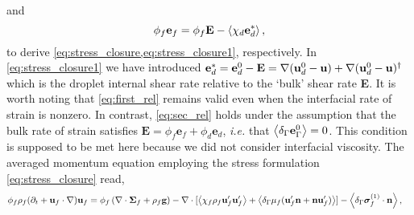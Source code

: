 and
\begin{equation}
\phi _f\textbf{e}_f
    = 
    \phi_f \textbf{E}
    - \avg{\chi_d \textbf{e}_d^*},
    \label{eq:sec_rel}
\end{equation}
to derive \ref{eq:stress_closure,eq:stress_closure1}, respectively. 
In \ref{eq:stress_closure1} we have introduced $\textbf{e}_d^* = \textbf{e}_d^0 - \textbf{E} = \mathbf{\nabla} (\textbf{u}_d^0-\textbf{u})+\mathbf{\nabla} (\textbf{u}_d^0-\textbf{u})^\dagger$ which is the droplet internal shear rate relative to the `bulk' shear rate \textbf{E}.
It is worth noting that \ref{eq:first_rel} remains valid even when the interfacial rate of strain is nonzero. 
In contrast, \ref{eq:sec_rel} holds under the assumption that the bulk rate of strain satisfies $\textbf{E} = \phi_f \textbf{e}_f + \phi_d \textbf{e}_d$, \textit{i.e.} that $\left<\delta_\Gamma \textbf{e}_\Gamma^0\right> = 0$. 
This condition is supposed to be met here because we did not consider interfacial viscosity\citep{nadim1996concise}.
The averaged momentum equation  employing the stress formulation \ref{eq:stress_closure} read, 
\begin{align}
    \phi_f \rho_f(\pddt + \textbf{u}_f  \cdot \grad) \textbf{u}_f
    &= \phi_f 
    \left(\div \bm{\Sigma}_f
    + \rho_f \textbf{g}\right)
    - \div 
    [\avg{\chi_f\rho_f \textbf{u}_f'\textbf{u}_f'}
    +\avg{\delta_\Gamma \mu_f( \textbf{u}_f'  \textbf{n} +  \textbf{n} \textbf{u}_f')}]
    - \avg{\delta_\Gamma \bm\sigma_f^{(1)}\cdot \textbf{n}},
    \label{eq:two_fluid_momentum}
\end{align}
